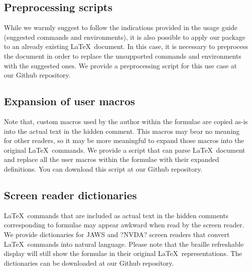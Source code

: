 \documentclass[11pt,a4paper]{article}
\begin{document}
\subsection{Preprocessing scripts}
While we warmly suggest to follow the indications provided in the usage guide (suggested commands and environments), it is also possible to apply our package to an already existing \LaTeX\ document. In this case, it is necessary to preprocess the document in order to replace the unsupported commands and environments with the suggested ones. We provide a preprocessing script for this use case at our Github repository.

\subsection{Expansion of user macros}
Note that, custom macros used by the author within the formulae are copied as-is into the actual text in the hidden comment. This macros may bear no meaning for other readers, so it may be more meaningful to expand those macros into the original \LaTeX\ commands. We provide a script that can parse \LaTeX\ document and replace all the user macros within the formulae with their expanded definitions. You can download this script at our Github repository.

\subsection{Screen reader dictionaries}
\LaTeX\ commands that are included as actual text in the hidden comments corresponding to formulae may appear awkward when read by the screen reader. We provide dictionaries for JAWS and ?NVDA? screen readers that convert \LaTeX\ commands into natural language. Please note that the braille refreshable display will still show the formulae in their original \LaTeX\ representations. The dictionaries can be downloaded at our Github repository.
\end{document}
